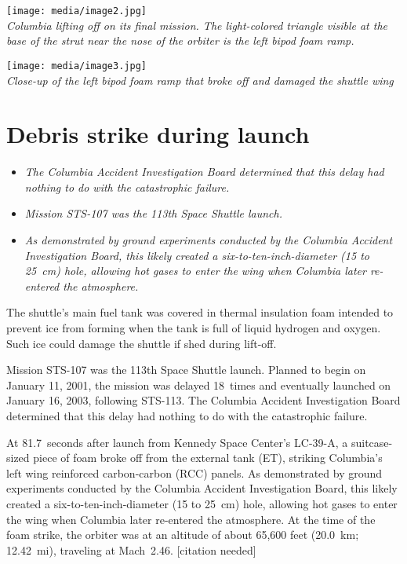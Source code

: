 \texttt{[image: media/image2.jpg]}\\
\emph{Columbia lifting off on its final mission. The light-colored
triangle visible at the base of the strut near the nose of the orbiter
is the left bipod foam ramp.}

\texttt{[image: media/image3.jpg]}\\
\emph{Close-up of the left bipod foam ramp that broke off and damaged
the shuttle wing}

\section{Debris strike during launch}\label{debris-strike-during-launch}

\begin{itemize}
\item
  \emph{The Columbia Accident Investigation Board determined that this
  delay had nothing to do with the catastrophic failure.}
\item
  \emph{Mission STS-107 was the 113th Space Shuttle launch.}
\item
  \emph{As demonstrated by ground experiments conducted by the Columbia
  Accident Investigation Board, this likely created a
  six-to-ten-inch-diameter (15 to 25~cm) hole, allowing hot gases to
  enter the wing when Columbia later re-entered the atmosphere.}
\end{itemize}

The shuttle's main fuel tank was covered in thermal insulation foam
intended to prevent ice from forming when the tank is full of liquid
hydrogen and oxygen. Such ice could damage the shuttle if shed during
lift-off.

Mission STS-107 was the 113th Space Shuttle launch. Planned to begin on
January 11, 2001, the mission was delayed 18~times and eventually
launched on January 16, 2003, following STS-113. The Columbia Accident
Investigation Board determined that this delay had nothing to do with
the catastrophic failure.

At 81.7~seconds after launch from Kennedy Space Center's LC-39-A, a
suitcase-sized piece of foam broke off from the external tank (ET),
striking Columbia's left wing reinforced carbon-carbon (RCC) panels. As
demonstrated by ground experiments conducted by the Columbia Accident
Investigation Board, this likely created a six-to-ten-inch-diameter (15
to 25~cm) hole, allowing hot gases to enter the wing when Columbia later
re-entered the atmosphere. At the time of the foam strike, the orbiter
was at an altitude of about 65,600 feet (20.0~km; 12.42~mi), traveling
at Mach~2.46. {[}citation needed{]}

